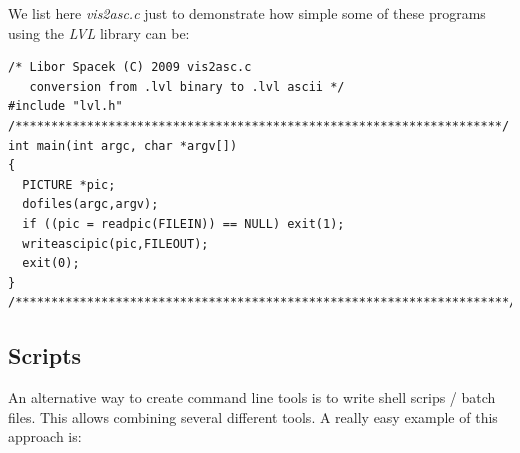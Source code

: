 \documentclass[11pt,twoside,english,a4paper]{article}
\begin{document}
We list here \emph{vis2asc.c} just to demonstrate how simple some of these
programs using the \emph{LVL} library can be:
\begin{verbatim}
/* Libor Spacek (C) 2009 vis2asc.c 
   conversion from .lvl binary to .lvl ascii */
#include "lvl.h"
/********************************************************************/
int main(int argc, char *argv[])
{
  PICTURE *pic;
  dofiles(argc,argv);
  if ((pic = readpic(FILEIN)) == NULL) exit(1);
  writeascipic(pic,FILEOUT);
  exit(0);
}
/*********************************************************************/
\end{verbatim}

\subsection{Scripts}
An alternative way to create command line tools is to write shell scrips / batch files.
This allows combining several different tools.
A really easy example of this approach is:
\end{document}
